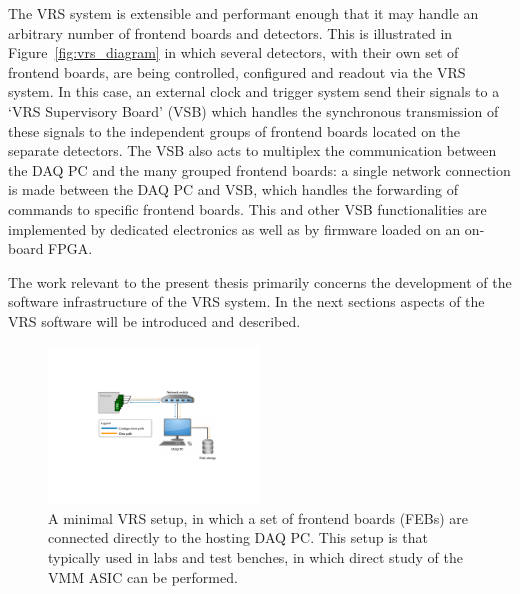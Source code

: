 The VRS system is extensible and performant enough that it may handle an arbitrary number of frontend boards
and detectors.
This is illustrated in Figure~\ref{fig:vrs_diagram} in which several detectors, with their own
set of frontend boards, are being controlled, configured and readout via the VRS system.
In this case, an external clock and trigger system send their signals to a `VRS Supervisory Board' (VSB)
which handles the synchronous transmission of these signals to the independent groups of frontend boards
located on the separate detectors.
The VSB also acts to multiplex the communication between the DAQ PC and the many grouped frontend boards:
a single network connection is made between the DAQ PC and VSB, which handles the forwarding of commands to
specific frontend boards.
This and other VSB functionalities are implemented by dedicated electronics as well as by
firmware loaded on an on-board FPGA.

The work relevant to the present thesis primarily concerns the development of the software
infrastructure of the VRS system.
In the next sections aspects of the VRS software will be introduced and described.

\begin{figure}[!htb]
    \begin{center}
        \includegraphics[width=0.5\textwidth]{figures/nsw/vrs/vrs_diagram_minimalPDF}
        \caption{
            A minimal VRS setup, in which a set of frontend boards (FEBs) are connected directly
            to the hosting DAQ PC.
            This setup is that typically used in labs and test benches, in which direct
            study of the VMM ASIC can be performed.
        }
        \label{fig:vrs_diagram_minimal}
    \end{center}
\end{figure}

